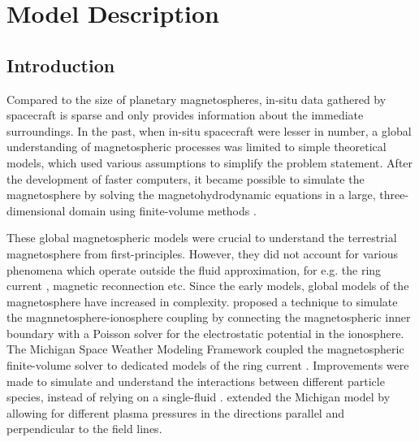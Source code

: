 
\chapter{Model Description}

\section{Introduction}

Compared to the size of planetary magnetospheres, in-situ data gathered by spacecraft is sparse and only provides information about the immediate surroundings. In the past, when in-situ spacecraft were lesser in number, a global understanding of magnetospheric processes was limited to simple theoretical models, which used various assumptions to simplify the problem statement. After the development of faster computers, it became possible to simulate the magnetosphere by solving the magnetohydrodynamic equations in a large, three-dimensional domain using finite-volume methods \cite{Leboeuf1978GlobalMagnetosphere,Walker1989GlobalMagnetosphere,Ashour-Abdalla1985SpaceSimulations}. 

These global magnetospheric models were crucial to understand the terrestrial magnetosphere from first-principles. However, they did not account for various phenomena which operate outside the fluid approximation, for e.g. the ring current \cite{Fok1999ModelingSubstorms}, magnetic reconnection \cite{Birn2001GeospaceChallenge} etc. Since the early models, global models of the magnetosphere have increased in complexity.  proposed a technique to simulate the magnnetosphere-ionosphere coupling by connecting the magnetospheric inner boundary with a Poisson solver for the electrostatic potential in the ionosphere. The Michigan Space Weather Modeling Framework coupled the magnetospheric finite-volume solver to dedicated models of the ring current \cite{DeZeeuw2004CouplingResults}. Improvements were made to simulate and understand the interactions between different particle species, instead of relying on a single-fluid \cite{Glocer2009MultifluidResults,Wiltberger2010InfluenceMagnetosphere}.  extended the Michigan model by allowing for different plasma pressures in the directions parallel and perpendicular to the field lines. 

